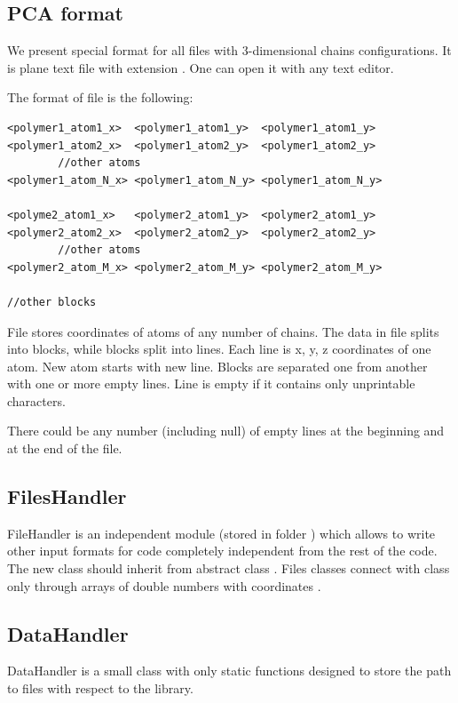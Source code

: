 \documentclass[12pt]{article}
\begin{document}
\begin{mySection}
\subsection{PCA format }\label{sec:.pca}
We present special format for all files with 3-dimensional chains configurations. It is plane text file with extension . One can open it with any text editor.

The format of   file is the following:

\begin{lstlisting}
<polymer1_atom1_x>	<polymer1_atom1_y>	<polymer1_atom1_y>
<polymer1_atom2_x>	<polymer1_atom2_y>	<polymer1_atom2_y>
		//other atoms	
<polymer1_atom_N_x>	<polymer1_atom_N_y>	<polymer1_atom_N_y>

<polyme2_atom1_x>	<polymer2_atom1_y>	<polymer2_atom1_y>
<polymer2_atom2_x>	<polymer2_atom2_y>	<polymer2_atom2_y>
		//other atoms	
<polymer2_atom_M_x>	<polymer2_atom_M_y>	<polymer2_atom_M_y>

//other blocks
\end{lstlisting}
File stores coordinates of atoms of any number of chains. The data in file splits into blocks, while blocks split into lines. Each line is x, y, z coordinates of one atom. New atom starts with new line.
Blocks are separated one from another with one or more empty lines. Line is empty if it contains only unprintable characters.

There could be any number (including null) of empty lines at the beginning and at the end of the file.

\subsection{FilesHandler}\label{sec:inputFilesHandler}
FileHandler is an independent module (stored in folder ) which allows to write other input formats for \PCA code completely independent from the rest of the code. The new class should inherit from abstract class . Files classes connect with class  only through arrays of double numbers with coordinates .

\subsection{DataHandler}\label{sec:dataHandler}
DataHandler is a small class with only static functions designed to store the path to files with respect to the \PCA library.

\end{mySection}
\end{document}
